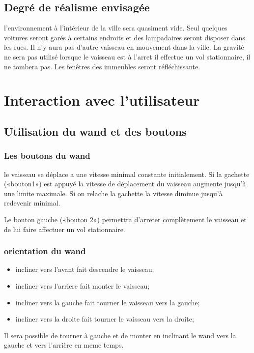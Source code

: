 \documentclass[a4paper,12pt]{article}
\begin{document}
\subsection{Degré de réalisme envisagée}

l'environnement à l'intérieur de la ville sera quasiment vide. Seul quelques voitures seront garés à certains endroits et des lampadaires seront disposer dans les rues. Il n'y aura pas d'autre vaisseau en mouvement dans la ville. La gravité ne sera pas utilisé lorsque le vaisseau est à l'arret il effectue un vol stationnaire, il ne tombera pas. Les fenêtres des immeubles seront réfléchissante.
 
\section{Interaction avec l'utilisateur}
\subsection{Utilisation du wand et des boutons}
\subsubsection{Les boutons du wand}
le vaisseau se déplace a une vitesse minimal constante initialement. Si la gachette («bouton1») est appuyé la vitesse de déplacement du vaisseau augmente jusqu'à une limite maximale. Si on relache la gachette la vitesse diminue
jusqu'à redevenir minimal.

Le bouton gauche («bouton 2») permettra d'arreter complètement le vaisseau et de lui faire affectuer un vol stationnaire.

 
\subsubsection{orientation du wand}
\begin{itemize}
\item incliner vers l'avant fait descendre le vaisseau;
\item incliner vers l'arriere fait monter le vaisseau;
\item incliner vers la gauche fait tourner le vaisseau vers la gauche;
\item incliner vers la droite fait tourner le vaisseau vers la droite;
\end{itemize}

Il sera possible de tourner à gauche et de monter en inclinant le wand vers la gauche et vers l'arrière en meme temps.
\end{document}
